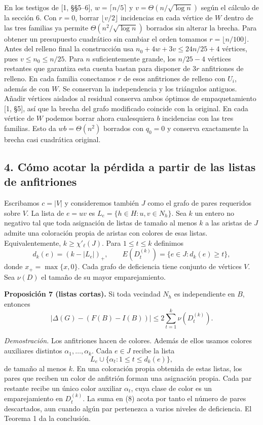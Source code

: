 \documentclass[spanish,11pt,a4paper]{article}
\begin{document}
En los testigos de {[}1, §§5--6{]}, \(w=\lceil n/5\rceil\) y \(v=\Theta(n/\sqrt{\log n})\) según el cálculo de la sección 6. Con \(r=0\), borrar \(\lfloor v/2\rfloor\) incidencias en cada vértice de \(W\) dentro de las tres familias ya permite \(\Theta(n^2/\sqrt{\log n})\) borrados sin alterar la brecha. Para obtener un presupuesto cuadrático sin cambiar el orden tomamos \(r=\lfloor n/100\rfloor\). Antes del relleno final la construcción usa \(n_0+4w+3v\le24n/25+4\) vértices, pues \(v\le n_0\le n/25\). Para \(n\) suficientemente grande, los \(n/25-4\) vértices restantes que garantiza esta cuenta bastan para disponer de \(3r\) anfitriones de relleno. En cada familia conectamos \(r\) de esos anfitriones de relleno con \(U_i\), además de con \(W\). Se conservan la independencia y los triángulos antiguos. Añadir vértices aislados al residual conserva ambos óptimos de empaquetamiento {[}1, §5{]}, así que la brecha del grafo modificado coincide con la original. En cada vértice de \(W\) podemos borrar ahora cualesquiera \(b\) incidencias con las tres familias. Esto da \(wb=\Theta(n^2)\) borrados con \(q_0=0\) y conserva exactamente la brecha casi cuadrática original.

\subsection{4. Cómo acotar la pérdida a partir de las listas de anfitriones}\label{cuxf3mo-acotar-la-puxe9rdida-a-partir-de-las-listas-de-anfitriones}

Escribamos \(c=|V|\) y consideremos también \(J\) como el grafo de pares requeridos sobre \(V\). La lista de \(e=uv\) es \(L_e=\{h\in H:u,v\in N_h\}\). Sea \(k\) un entero no negativo tal que toda asignación de listas de tamaño al menos \(k\) a las aristas de \(J\) admite una coloración propia de aristas con colores de esas listas. Equivalentemente, \(k\ge\chi'_\ell(J)\). Para \(1\le t\le k\) definimos \[
d_k(e)=(k-|L_e|)_+,\qquad
E(D_t^{(k)})=\{e\in J:d_k(e)\ge t\},
\] donde \(x_+=\max\{x,0\}\). Cada grafo de deficiencia tiene conjunto de vértices \(V\). Sea \(\nu(D)\) el tamaño de su mayor emparejamiento.

\textbf{Proposición 7 (listas cortas).} Si toda vecindad \(N_h\) es independiente en \(B\), entonces \[
|\Delta(G)-(F(B)-I(B))|\le 2\sum_{t=1}^{k}\nu(D_t^{(k)}). \tag{8}
\]

\emph{Demostración.} Los anfitriones hacen de colores. Además de ellos usamos colores auxiliares distintos \(\alpha_1,\ldots,\alpha_k\). Cada \(e\in J\) recibe la lista \[
L_e\cup\{\alpha_t:1\le t\le d_k(e)\},
\] de tamaño al menos \(k\). En una coloración propia obtenida de estas listas, los pares que reciben un color de anfitrión forman una asignación propia. Cada par restante recibe un único color auxiliar \(\alpha_t\), cuya clase de color es un emparejamiento en \(D_t^{(k)}\). La suma en (8) acota por tanto el número de pares descartados, aun cuando algún par pertenezca a varios niveles de deficiencia. El Teorema 1 da la conclusión.
\end{document}
